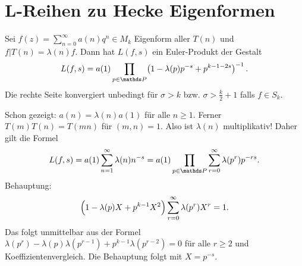 \section{L-Reihen zu Hecke Eigenformen}

\begin{satz}
	Sei $f(z) = \sum_{n=0}^\infty a(n)q^n \in M_k$ Eigenform aller $T(n)$ und $f|T(n) = \lambda(n)f$. Dann hat $L(f, s)$ ein Euler-Produkt der Gestalt 
	\[
		L(f,s) = a(1) \prod_{p \in \PP} \bigl(1 - \lambda(p)p^{-s} + p^{k-1-2s}\bigr)^{-1}\,.
	\]
	Die rechte Seite konvergiert unbedingt für $\sigma > k$ bzw. $\sigma > \frac{k}{2} + 1$ falls $f \in S_k$.
\end{satz}


\begin{bewe}
	Schon gezeigt: $a(n) = \lambda(n)a(1)$ für alle $n \geq 1$. Ferner $T(m)T(n) = T(mn)$ für $(m,n) = 1$. Also ist $\lambda(n)$ multiplikativ! Daher gilt die Formel 
	\[L(f,s) = a(1)\sum_{n=1}^\infty \lambda(n)n^{-s} = a(1) \prod_{p \in \PP} \sum_{r=0}^\infty \lambda(p^r)p^{-rs}.\]
	Behauptung: 
	\[
		\Bigl(1 - \lambda(p)X + p^{k-1}X^2\Bigr) \sum_{r=0}^\infty \lambda(p^r) X^r = 1.
	\]
	Das folgt unmittelbar aus der Formel $\lambda(p^r) - \lambda(p)\lambda(p^{r-1}) + p^{k-1}\lambda(p^{r-2}) = 0$ für alle $r \geq 2$ und Koeffizientenvergleich. Die Behauptung folgt mit $X = p^{-s}$.
\end{bewe}